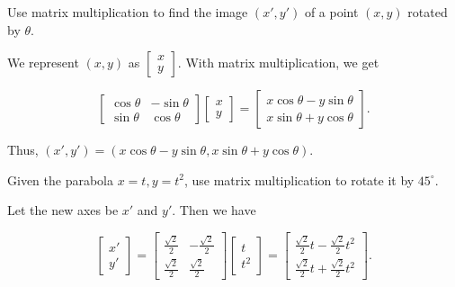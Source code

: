 \documentclass[../key.tex]{subfiles}
\begin{document}
\begin{outer_problem}
\item Use matrix multiplication to find the image $(x',y')$ of a point $(x,y)$ rotated by $\theta$.
\end{outer_problem}

We represent $(x,y)$ as $\begin{bmatrix} x \\ y \end{bmatrix}$. With matrix multiplication, we get

$$\begin{bmatrix} \cos\theta & -\sin\theta \\ \sin\theta & \cos\theta \end{bmatrix} \begin{bmatrix} x \\ y \end{bmatrix} = \begin{bmatrix} x\cos\theta - y\sin\theta \\ x\sin\theta + y\cos\theta \end{bmatrix}.$$

Thus, $(x',y')=(x\cos\theta - y\sin\theta, x\sin\theta + y\cos\theta)$.

\begin{outer_problem}
\item
\end{outer_problem}

\begin{inner_problem}[start=1]
\item Given the parabola $x=t,y=t^2$, use matrix multiplication to rotate it by $45^\circ$.
\end{inner_problem}

Let the new axes be $x'$ and $y'$. Then we have

$$\begin{bmatrix} x' \\ y' \end{bmatrix} = \begin{bmatrix} \frac{\sqrt{2}}{2} & -\frac{\sqrt{2}}{2} \\ \frac{\sqrt{2}}{2} & \frac{\sqrt{2}}{2} \end{bmatrix} \begin{bmatrix} t \\ t^2 \end{bmatrix} = \begin{bmatrix} \frac{\sqrt{2}}{2}t - \frac{\sqrt{2}}{2}t^2 \\ \frac{\sqrt{2}}{2}t + \frac{\sqrt{2}}{2}t^2 \end{bmatrix}.$$
\end{document}
